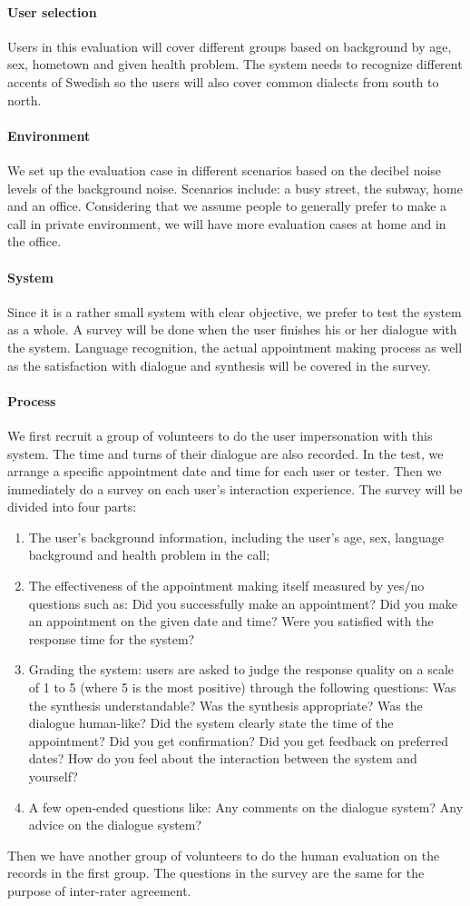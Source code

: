 \documentclass{article}
\begin{document}
\paragraph{User selection}
Users in this evaluation will cover different groups based on background by age, sex, hometown and given health problem. The system needs to recognize different accents of Swedish so the users will also cover common dialects from south to north.
\paragraph{Environment}
We set up the evaluation case in different scenarios based on the decibel noise levels of the background noise. Scenarios include: a busy street, the subway, home and an office. Considering that we assume people to generally prefer to make a call in private environment, we will have more evaluation cases at home and in the office.
\paragraph{System}
Since it is a rather small system with clear objective, we prefer to test the system as a whole. A survey will be done when the user finishes his or her dialogue with the system. Language recognition, the actual appointment making process as well as the satisfaction with dialogue and synthesis will be covered in the survey.
\paragraph{Process}
We first recruit a group of volunteers to do the user impersonation with this system. The time and turns of their dialogue are also recorded. In the test, we arrange a specific appointment date and time for each user or tester. Then we immediately do a survey on each user's interaction experience. The survey will be divided into four parts: 
\begin{enumerate}
    \item The user's background information, including the user's age, sex, language background and health problem in the call; 
    \item The effectiveness of the appointment making itself measured by yes/no questions such as: Did you successfully make an appointment? Did you make an appointment on the given date and time? Were you satisfied with the response time for the system?
    \item Grading the system: users are asked to judge the response quality on a scale of 1 to 5 (where 5 is the most positive) through the following questions: Was the synthesis understandable? Was the synthesis appropriate? Was the dialogue human-like? Did the system clearly state the time of the appointment? Did you get confirmation? Did you get feedback on preferred dates? How do you feel about the interaction between the system and yourself?
    \item A few open-ended questions like: Any comments on the dialogue system? Any advice on the dialogue system? 
\end{enumerate}
Then we have another group of volunteers to do the human evaluation on the records in the first group. The questions in the survey are the same for the purpose of inter-rater agreement. 
\end{document}

